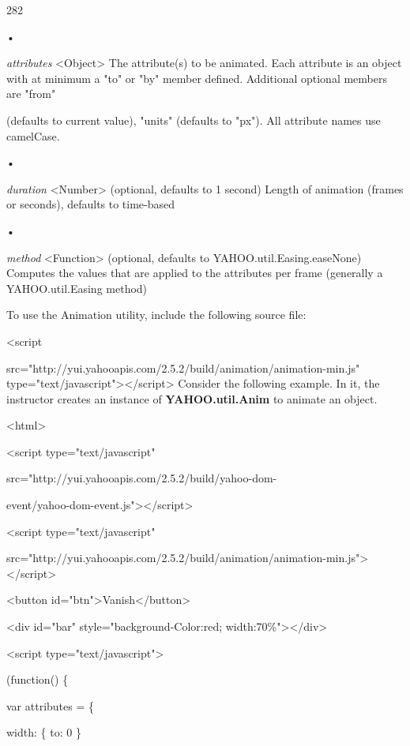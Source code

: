 \documentclass[
]{article}
\begin{document}
282

\protect\hypertarget{index_split_015.htmlux5cux23p283}{}{}•

\emph{attributes} \textless Object\textgreater{} The attribute(s) to be
animated. Each attribute is an object with at minimum a "to" or "by"
member defined. Additional optional members are "from"

(defaults to current value), "units" (defaults to "px"). All attribute
names use camelCase.

•

\emph{duration} \textless Number\textgreater{} (optional, defaults to 1
second) Length of animation (frames or seconds), defaults to time-based

•

\emph{method} \textless Function\textgreater{} (optional, defaults to
YAHOO.util.Easing.easeNone) Computes the values that are applied to the
attributes per frame (generally a YAHOO.util.Easing method)

To use the Animation utility, include the following source file:

\textless script

src="http://yui.yahooapis.com/2.5.2/build/animation/animation-min.js"
type="text/javascript"\textgreater\textless/script\textgreater{}
Consider the following example. In it, the instructor creates an
instance of \textbf{YAHOO.util.Anim} to animate an object.

\textless html\textgreater{}

\textless script type="text/javascript"

src="http://yui.yahooapis.com/2.5.2/build/yahoo-dom-

event/yahoo-dom-event.js"\textgreater\textless/script\textgreater{}

\textless script type="text/javascript"

src="http://yui.yahooapis.com/2.5.2/build/animation/animation-min.js"\textgreater\textless/script\textgreater{}

\textless button
id="btn"\textgreater Vanish\textless/button\textgreater{}

\textless div id="bar" style="background-Color:red;
width:70\%"\textgreater\textless/div\textgreater{}

\textless script type="text/javascript"\textgreater{}

(function() \{

var attributes = \{

width: \{ to: 0 \}
\end{document}
